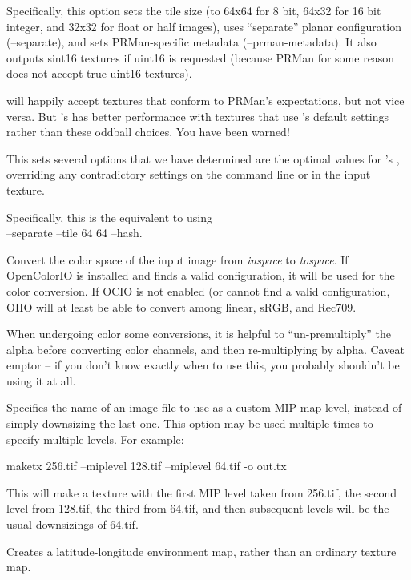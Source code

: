 Specifically, this option sets the tile size (to 64x64 for 8 bit,
64x32 for 16 bit integer, and 32x32 for float or {\cf half} images),
uses ``separate'' planar configuration ({\cf --separate}), and sets
PRMan-specific metadata ({\cf --prman-metadata}).  It also outputs 
sint16 textures if uint16 is requested (because PRMan for some reason
does not accept true uint16 textures).

\OpenImageIO will happily accept textures that conform to PRMan's
expectations, but not vice versa.  But \OpenImageIO's \TextureSystem
has better performance with textures that use \maketx's default settings
rather than these oddball choices.  You have been warned!
\apiend

This sets several options that we have determined are the 
optimal values for \OpenImageIO's \TextureSystem, overriding any
contradictory settings on the command line or in the input texture.

Specifically, this is the equivalent to using \\
 {\cf --separate --tile 64 64 --hash}.
\apiend

Convert the color space of the input image from \emph{inspace} to
\emph{tospace}.  If OpenColorIO is installed and finds a valid
configuration, it will be used for the color conversion.  If OCIO
is not enabled (or cannot find a valid configuration, OIIO will at
least be able to convert among linear, sRGB, and Rec709.
\apiend

When undergoing color some conversions, it is helpful to
``un-premultiply'' the alpha before converting color channels, and then
re-multiplying by alpha.  Caveat emptor -- if you don't know exactly
when to use this, you probably shouldn't be using it at all.
\apiend


Specifies the name of an image file to use as a custom MIP-map level, 
instead of simply downsizing the last one.  This option may be used
multiple times to specify multiple levels.  For example:
\begin{code}
    maketx 256.tif --miplevel 128.tif --miplevel 64.tif -o out.tx
\end{code}
This will make a texture with the first MIP level taken from {\cf 256.tif},
the second level from {\cf 128.tif}, the third from {\cf 64.tif}, and
then subsequent levels will be the usual downsizings of {\cf 64.tif}.
\apiend

Creates a latitude-longitude environment map, rather than an ordinary
texture map.
\apiend

